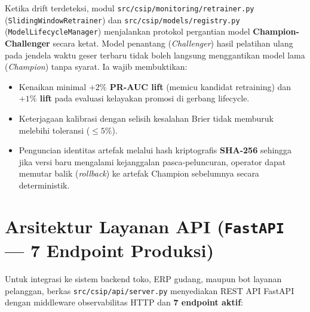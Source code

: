 \documentclass[11pt,a4paper,oneside]{book}
\newcommand{\code}[1]{{\small\nolinkurl{#1}}}
\begin{document}
Ketika drift terdeteksi, modul \code{src/csip/monitoring/retrainer.py} (\code{SlidingWindowRetrainer}) dan \code{src/csip/models/registry.py} (\code{ModelLifecycleManager}) menjalankan protokol pergantian model \textbf{Champion-Challenger} secara ketat. Model penantang (\emph{Challenger}) hasil pelatihan ulang pada jendela waktu geser terbaru tidak boleh langsung menggantikan model lama (\emph{Champion}) tanpa syarat. Ia wajib membuktikan:
\begin{itemize}
  \item Kenaikan minimal \textbf{$+2\%$ PR-AUC lift} (memicu kandidat retraining) dan \textbf{$+1\%$ lift} pada evaluasi kelayakan promosi di gerbang lifecycle.
  \item Keterjagaan kalibrasi dengan selisih kesalahan Brier tidak memburuk melebihi toleransi ($\le 5\%$).
  \item Penguncian identitas artefak melalui hash kriptografis \textbf{SHA-256} sehingga jika versi baru mengalami kejanggalan pasca-peluncuran, operator dapat memutar balik (\emph{rollback}) ke artefak Champion sebelumnya secara deterministik.
\end{itemize}

\section{Arsitektur Layanan API (\texttt{FastAPI} --- 7 Endpoint Produksi)}

Untuk integrasi ke sistem backend toko, ERP gudang, maupun bot layanan pelanggan, berkas \code{src/csip/api/server.py} menyediakan REST API FastAPI dengan middleware observabilitas HTTP dan \textbf{7 endpoint aktif}:
\end{document}
